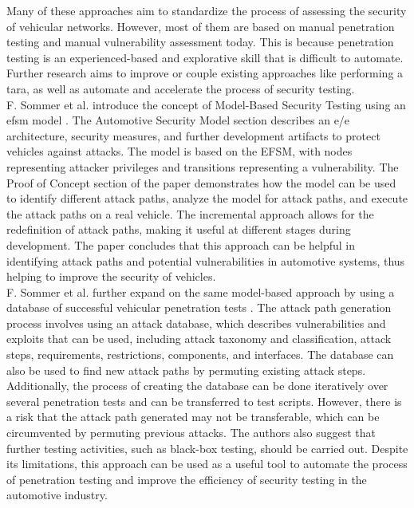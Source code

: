 Many of these approaches aim to standardize the process of assessing the security of vehicular networks. However, most of them are based on manual penetration testing and manual vulnerability assessment today. 
This is because penetration testing is an experienced-based and explorative skill that is difficult to automate. 
Further research aims to improve or couple existing approaches like performing a \acrshort{tara}, as well as automate and accelerate the process of security testing.\\

F. Sommer et al. introduce the concept of Model-Based Security Testing using an \acrshort{efsm} model \cite{model_based_testing}.
The Automotive Security Model section describes an \acrshort{e/e} architecture, security measures, and further development artifacts to protect vehicles against attacks.
The model is based on the EFSM, with nodes representing attacker privileges and transitions representing a vulnerability.
The Proof of Concept section of the paper demonstrates how the model can be used to identify different attack paths, analyze the model for attack paths, and execute the attack paths on a real vehicle. 
The incremental approach allows for the redefinition of attack paths, making it useful at different stages during development. 
The paper concludes that this approach can be helpful in identifying attack paths and potential vulnerabilities in automotive systems, thus helping to improve the security of vehicles.\\

F. Sommer et al. further expand on the same model-based approach by using a database of successful vehicular penetration tests \cite{attack_database}.
The attack path generation process involves using an attack database, which describes vulnerabilities and exploits that can be used, including attack taxonomy and classification, attack steps, requirements, restrictions, components, and interfaces. 
The database can also be used to find new attack paths by permuting existing attack steps. 
Additionally, the process of creating the database can be done iteratively over several penetration tests and can be transferred to test scripts. 
However, there is a risk that the attack path generated may not be transferable, which can be circumvented by permuting previous attacks. 
The authors also suggest that further testing activities, such as black-box testing, should be carried out. 
Despite its limitations, this approach can be used as a useful tool to automate the process of penetration testing and improve the efficiency of security testing in the automotive industry.\\

